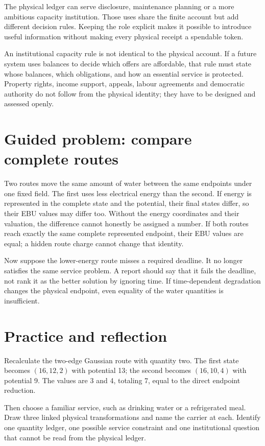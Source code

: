 The physical ledger can serve disclosure, maintenance planning or a more ambitious capacity institution. Those uses share the finite account but add different decision rules. Keeping the role explicit makes it possible to introduce useful information without making every physical receipt a spendable token.

An institutional capacity rule is not identical to the physical account. If a future system uses balances to decide which offers are affordable, that rule must state whose balances, which obligations, and how an essential service is protected. Property rights, income support, appeals, labour agreements and democratic authority do not follow from the physical identity; they have to be designed and assessed openly.

\section{Guided problem: compare complete routes}
Two routes move the same amount of water between the same endpoints under one fixed field. The first uses less electrical energy than the second. If energy is represented in the complete state and the potential, their final states differ, so their EBU values may differ too. Without the energy coordinates and their valuation, the difference cannot honestly be assigned a number. If both routes reach exactly the same complete represented endpoint, their EBU values are equal; a hidden route charge cannot change that identity.

Now suppose the lower-energy route misses a required deadline. It no longer satisfies the same service problem. A report should say that it fails the deadline, not rank it as the better solution by ignoring time. If time-dependent degradation changes the physical endpoint, even equality of the water quantities is insufficient.

\section{Practice and reflection}
Recalculate the two-edge Gaussian route with quantity two. The first state becomes $(16,12,2)$ with potential 13; the second becomes $(16,10,4)$ with potential 9. The values are 3 and 4, totaling 7, equal to the direct endpoint reduction.

Then choose a familiar service, such as drinking water or a refrigerated meal. Draw three linked physical transformations and name the carrier at each. Identify one quantity ledger, one possible service constraint and one institutional question that cannot be read from the physical ledger.

